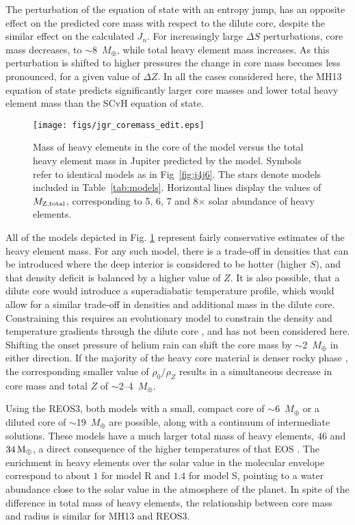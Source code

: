 The perturbation of the equation of state with an entropy jump, has an opposite
effect on the predicted core mass with respect to the dilute core, despite the similar
effect on the calculated $J_n$. For increasingly large $\Delta S$ perturbations, core
mass decreases, to $\sim$8~$M_\oplus$, while total heavy element mass increases.  As
this perturbation is shifted to higher pressures the change in core mass becomes less
pronounced, for a given value of $\Delta Z$. In all the cases considered here, the
MH13 equation of state predicts significantly larger core masses and lower
total heavy element mass than the SCvH equation of state.

\begin{figure}[h]
\centering

\texttt{[image: figs/jgr\_coremass\_edit.eps]}

\caption{Mass of heavy elements in the core of the model versus the total heavy
    element mass in Jupiter predicted by the model. Symbols refer to identical models
    as in Fig~\ref{fig:j4j6}. The stars denote models included in
    Table~\ref{tab:models}.  Horizontal lines display the values of $M_{\rm
    Z,total}$, corresponding to 5, 6, 7 and 8$\times$ solar abundance of heavy elements.
}
\label{fig:coremass}
\end{figure}


All of the models depicted in Fig. \ref{fig:coremass} represent fairly conservative
estimates of the heavy element mass. For any such model, there is a trade-off in
densities that can be introduced where the deep interior is considered to be hotter
(higher $S$), and that density deficit is balanced by a higher value of $Z$. 
It is also possible, that a dilute core would
introduce a superadiabatic temperature  profile, which would allow for a similar
trade-off in densities and additional mass in the dilute core.  Constraining this
requires an evolutionary model to constrain the density and temperature gradients
through the dilute core \citep{Leconte2012,Leconte2013}, and has not been
considered here.  Shifting the onset pressure of helium rain can shift the core mass
by $\sim$2~$M_\oplus$ in either direction. If the majority
of the heavy core material is denser rocky phase \citep{Soubiran2016}, the
corresponding smaller value of $\rho_0/\rho_Z$  results in a simultaneous decrease in
core mass and total $Z$ of $\sim$2--4~$M_\oplus$.

Using the REOS3, both models with a small, compact core of $\sim$6~$M_\oplus$ or a
diluted core of $\sim$19~$M_\oplus$ are possible, along with a continuum of
intermediate solutions.  These models have a much larger total mass of heavy
elements, $46$ and $34\,\rm M_\oplus$, a direct consequence of the higher
temperatures of that EOS \citep[see][]{miguel2016}.  The enrichment in heavy elements
over the solar value in the molecular envelope correspond to about $1$ for model R
and $1.4$ for model S, pointing to a water abundance close to the solar value in the
atmosphere of the planet.  In spite of the difference in total mass of heavy
elements, the relationship between core mass and radius is similar for MH13 and
REOS3.

